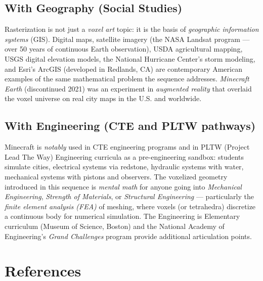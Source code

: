 \documentclass[12pt,a4paper]{scrartcl}
\begin{document}
\subsection{With Geography (Social Studies)}
Rasterization is not just a \emph{voxel art} topic: it is the basis of \emph{geographic information systems} (GIS). Digital maps, satellite imagery (the NASA Landsat program --- over 50 years of continuous Earth observation), USDA agricultural mapping, USGS digital elevation models, the National Hurricane Center's storm modeling, and Esri's ArcGIS (developed in Redlands, CA) are contemporary American examples of the same mathematical problem the sequence addresses. \emph{Minecraft Earth} (discontinued 2021) was an experiment in \emph{augmented reality} that overlaid the voxel universe on real city maps in the U.S. and worldwide.

\subsection{With Engineering (CTE and PLTW pathways)}
Minecraft is \emph{notably} used in CTE engineering programs and in PLTW (Project Lead The Way) Engineering curricula as a pre-engineering sandbox: students simulate cities, electrical systems via redstone, hydraulic systems with water, mechanical systems with pistons and observers. The voxelized geometry introduced in this sequence is \emph{mental math} for anyone going into \emph{Mechanical Engineering}, \emph{Strength of Materials}, or \emph{Structural Engineering} --- particularly the \emph{finite element analysis (FEA)} of meshing, where voxels (or tetrahedra) discretize a continuous body for numerical simulation. The Engineering is Elementary curriculum (Museum of Science, Boston) and the National Academy of Engineering's \emph{Grand Challenges} program provide additional articulation points.

\section{References}\label{sec:references}
\end{document}
